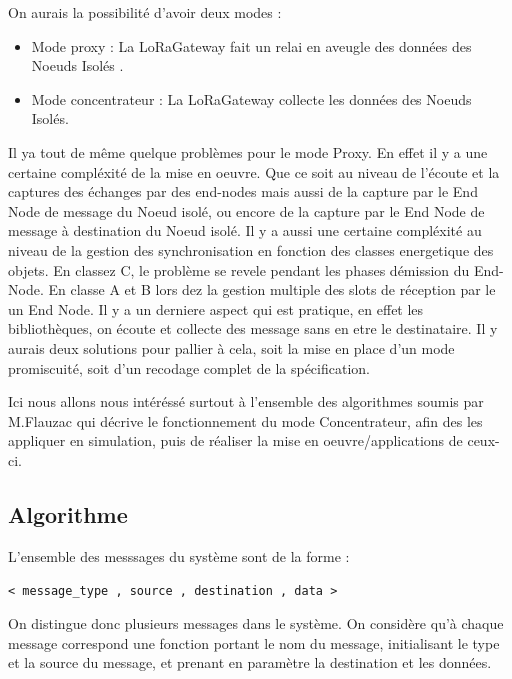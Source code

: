 \documentclass[11pt]{article}
\begin{document}
On aurais la possibilité d'avoir deux modes : 
\begin{itemize}
\item Mode proxy : La LoRaGateway fait un relai en aveugle des données des Noeuds Isolés .
\item Mode concentrateur : La LoRaGateway collecte les données des Noeuds Isolés.
\end{itemize}
Il ya tout de même quelque problèmes pour le mode Proxy. 
En effet il y a une certaine compléxité de la mise en oeuvre. Que ce soit au niveau de l'écoute et la captures des échanges par des end-nodes mais aussi de la capture par le End Node de message du Noeud isolé, ou encore de la capture par le End Node de message à destination du Noeud isolé. Il y a aussi une certaine compléxité au niveau de la gestion des synchronisation en fonction des classes energetique des objets. En classez C, le problème se revele pendant les phases démission du End-Node. En classe A et B lors dez la gestion multiple des slots de réception par le un End Node. Il y a un derniere aspect qui est pratique, en effet les bibliothèques, on écoute et collecte des message sans en etre le destinataire. Il y aurais deux solutions pour pallier à cela, soit la mise en place d'un mode promiscuité, soit d'un recodage complet de la spécification.


Ici nous allons nous intéréssé surtout à l'ensemble des algorithmes soumis par M.Flauzac qui décrive le fonctionnement du mode Concentrateur, afin des les appliquer en  simulation, puis de réaliser la mise en oeuvre/applications de ceux-ci.

\newpage
\subsection{Algorithme}


L'ensemble des messsages du système sont de la forme :

\begin{center}
\texttt{< message\_type , source , destination , data >}
\end{center}

On distingue donc plusieurs messages dans le système. On considère qu'à chaque message correspond une fonction portant le nom du message, initialisant le type et la source du message, et prenant en paramètre la destination et les données.
\end{document}
